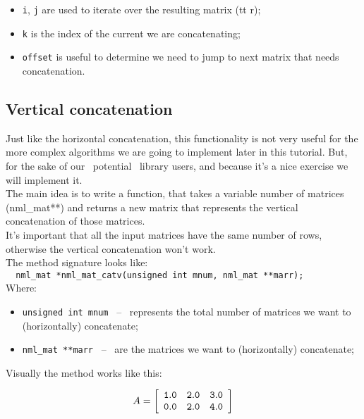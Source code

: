 \begin{itemize}
\item {\tt i}, {\tt j} are used to iterate over the resulting matrix ({tt r});
\item {\tt k} is the index of the current we are concatenating;
\item {\tt offset} is useful to determine we need to jump to next matrix that needs concatenation.
\end{itemize}

\subsection{Vertical concatenation}

Just like the horizontal concatenation, this functionality is not very useful for the more complex algorithms we are going to implement later in this tutorial. But, for the sake of our ~potential~ library users, and because it’s a nice exercise we will implement it.
\\

The main idea is to write a function, that takes a variable number of matrices (nml\_mat**) and returns a new matrix that represents the vertical concatenation of those matrices.
\\

It’s important that all the input matrices have the same number of rows, otherwise the vertical concatenation won’t work.
\\

The method signature looks like:
\\

\texttt{ \ nml\_mat *nml\_mat\_catv(unsigned int mnum, nml\_mat **marr);
}
\\

Where:

\begin{itemize}
\item {\tt unsigned int mnum} \ -- \ represents the total number of matrices we want to (horizontally) concatenate;
\item {\tt nml\_mat **marr} \  -- \ are the matrices we want to (horizontally) concatenate;
\end{itemize}

Visually the method works like this:

$$
A = \left[
\begin{array}{rrr}
\tt 1.0 & \tt 2.0 & \tt 3.0 \\
\tt 0.0 & \tt 2.0 & \tt 4.0
\end{array}
\right]
$$

